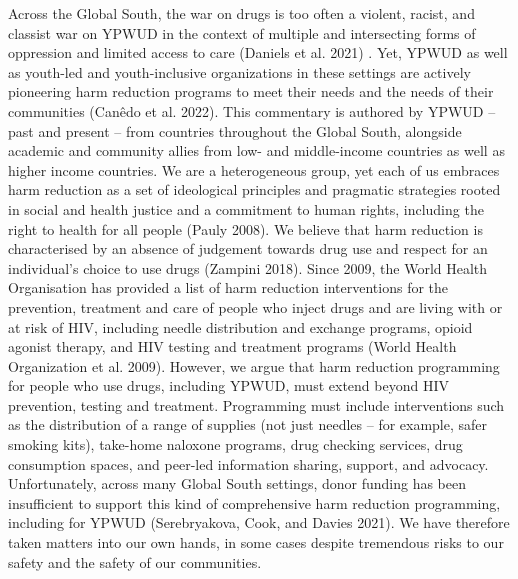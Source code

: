 \documentclass[
  letterpaper,
  DIV=11,
  numbers=noendperiod]{scrartcl}
\begin{document}
Across the Global South, the war on drugs is too often a violent,
racist, and classist war on YPWUD in the context of multiple and
intersecting forms of oppression and limited access to care (Daniels et
al. 2021) . Yet, YPWUD as well as youth-led and youth-inclusive
organizations in these settings are actively pioneering harm reduction
programs to meet their needs and the needs of their communities (Canêdo
et al. 2022). This commentary is authored by YPWUD -- past and present
-- from countries throughout the Global South, alongside academic and
community allies from low- and middle-income countries as well as higher
income countries. We are a heterogeneous group, yet each of us embraces
harm reduction as a set of ideological principles and pragmatic
strategies rooted in social and health justice and a commitment to human
rights, including the right to health for all people (Pauly 2008). We
believe that harm reduction is characterised by an absence of judgement
towards drug use and respect for an individual's choice to use drugs
(Zampini 2018). Since 2009, the World Health Organisation has provided a
list of harm reduction interventions for the prevention, treatment and
care of people who inject drugs and are living with or at risk of HIV,
including needle distribution and exchange programs, opioid agonist
therapy, and HIV testing and treatment programs (World Health
Organization et al. 2009). However, we argue that harm reduction
programming for people who use drugs, including YPWUD, must extend
beyond HIV prevention, testing and treatment. Programming must include
interventions such as the distribution of a range of supplies (not just
needles -- for example, safer smoking kits), take-home naloxone
programs, drug checking services, drug consumption spaces, and peer-led
information sharing, support, and advocacy. Unfortunately, across many
Global South settings, donor funding has been insufficient to support
this kind of comprehensive harm reduction programming, including for
YPWUD (Serebryakova, Cook, and Davies 2021). We have therefore taken
matters into our own hands, in some cases despite tremendous risks to
our safety and the safety of our communities.
\end{document}
